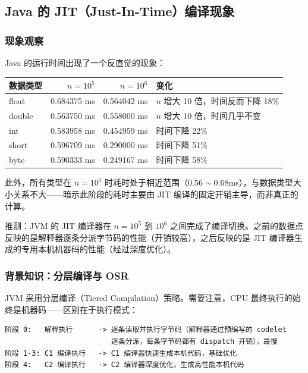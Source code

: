 \documentclass[12pt,a4paper]{article}
\begin{document}

\subsection{Java 的 JIT（Just-In-Time）编译现象}

\subsubsection{现象观察}

Java 的运行时间出现了一个反直觉的现象：

\begin{table}[H]
\centering
\begin{tabular}{l r r l}
\toprule
数据类型 & $n=10^5$ & $n=10^6$ & 变化 \\
\midrule
float  & 0.684375 ms & 0.564042 ms & $n$ 增大 10 倍，时间反而下降 18\% \\
double & 0.563750 ms & 0.558000 ms & $n$ 增大 10 倍，时间几乎不变 \\
int    & 0.583958 ms & 0.454959 ms & 时间下降 22\% \\
short  & 0.596709 ms & 0.290000 ms & 时间下降 51\% \\
byte   & 0.590333 ms & 0.249167 ms & 时间下降 58\% \\
\bottomrule
\end{tabular}
\end{table}

此外，所有类型在 $n=10^5$ 时耗时处于相近范围（$0.56{\sim}0.68$ms），与数据类型大小关系不大——暗示此阶段的耗时主要由 JIT 编译的固定开销主导，而非真正的计算。

推测：JVM 的 JIT 编译器在 $n=10^5$ 到 $10^6$ 之间完成了编译切换。之前的数据点反映的是解释器逐条分派字节码的性能（开销较高），之后反映的是 JIT 编译器生成的专用本机机器码的性能（经过深度优化）。

\subsubsection{背景知识：分层编译与 OSR}

JVM 采用分层编译（Tiered Compilation）策略。需要注意，CPU 最终执行的始终是机器码——区别在于执行模式：

\begin{lstlisting}
阶段 0:   解释执行      -> 逐条读取并执行字节码（解释器通过预编写的 codelet
                         逐条分派，每条字节码都有 dispatch 开销），最慢
阶段 1-3: C1 编译执行   -> C1 编译器快速生成本机代码，基础优化
阶段 4:   C2 编译执行   -> C2 编译器深度优化，生成高性能本机代码
\end{lstlisting}
\end{document}
